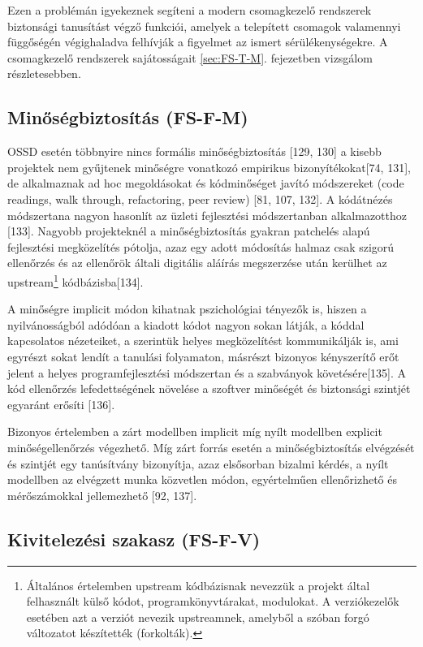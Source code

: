 \documentclass[12pt,magyar,a4paper,oneside]{scrreprt}
\begin{document}
Ezen a problémán igyekeznek segíteni a modern csomagkezelő rendszerek
biztonsági tanusítást végző funkciói, amelyek a telepített csomagok
valamennyi függőségén végighaladva felhívják a figyelmet az ismert
sérülékenységekre. A csomagkezelő rendszerek sajátosságait
\ref{sec:FS-T-M}. fejezetben vizsgálom részletesebben.

\hypertarget{sec:FS-F-M}{%
\subsection{Minőségbiztosítás (FS-F-M)}\label{sec:FS-F-M}}

OSSD esetén többnyire nincs formális minőségbiztosítás {[}129, 130{]} a
kisebb projektek nem gyűjtenek minőségre vonatkozó empirikus
bizonyítékokat{[}74, 131{]}, de alkalmaznak ad hoc megoldásokat és
kódminőséget javító módszereket (code readings, walk through,
refactoring, peer review) {[}81, 107, 132{]}. A kódátnézés módszertana
nagyon hasonlít az üzleti fejlesztési módszertanban alkalmazotthoz
{[}133{]}. Nagyobb projekteknél a minőségbiztosítás gyakran patchelés
alapú fejlesztési megközelítés pótolja, azaz egy adott módosítás halmaz
csak szigorú ellenőrzés és az ellenőrök általi digitális aláírás
megszerzése után kerülhet az upstream\footnote{Általános értelemben
  upstream kódbázisnak nevezzük a projekt által felhasznált külső kódot,
  programkönyvtárakat, modulokat. A verziókezelők esetében azt a verziót
  nevezik upstreamnek, amelyből a szóban forgó változatot készítették
  (forkolták).} kódbázisba{[}134{]}.

A minőségre implicit módon kihatnak pszichológiai tényezők is, hiszen a
nyilvánosságból adódóan a kiadott kódot nagyon sokan látják, a kóddal
kapcsolatos nézeteiket, a szerintük helyes megközelítést kommunikálják
is, ami egyrészt sokat lendít a tanulási folyamaton, másrészt bizonyos
kényszerítő erőt jelent a helyes programfejlesztési módszertan és a
szabványok követésére{[}135{]}. A kód ellenőrzés lefedettségének
növelése a szoftver minőségét és biztonsági szintjét egyaránt erősíti
{[}136{]}.

Bizonyos értelemben a zárt modellben implicit míg nyílt modellben
explicit minőségellenőrzés végezhető. Míg zárt forrás esetén a
minőségbiztosítás elvégzését és szintjét egy tanúsítvány bizonyítja,
azaz elsősorban bizalmi kérdés, a nyílt modellben az elvégzett munka
közvetlen módon, egyértelműen ellenőrizhető és mérőszámokkal
jellemezhető {[}92, 137{]}.

\hypertarget{sec:FS-F-V}{%
\subsection{Kivitelezési szakasz (FS-F-V)}\label{sec:FS-F-V}}
\end{document}
